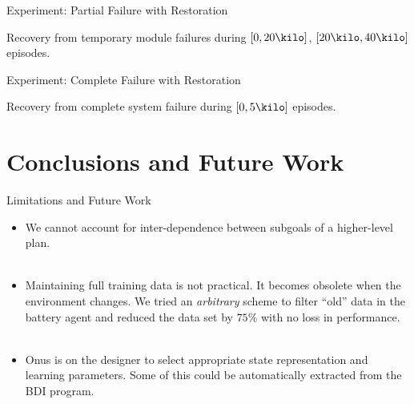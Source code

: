 \documentclass[10pt]{beamer}
\renewcommand\example[1]{{\color{black!50!green}#1}}
\begin{document}
\begin{frame}[allowframebreaks]{Experiment: Partial Failure with Restoration}
\begin{center}
\resizebox{0.7\textwidth}{!}{

}

Recovery from \alert{temporary module failures} during $[0,20\kilo]$, $[20\kilo,40\kilo]$ episodes.
\end{center}
\end{frame}

\begin{frame}[allowframebreaks]{Experiment: Complete Failure with Restoration}
\begin{center}
\resizebox{0.7\textwidth}{!}{

}

Recovery from \alert{complete system failure} during $[0,5\kilo]$ episodes.
\end{center}
\end{frame}


\section{Conclusions and Future Work}

\begin{frame}{Limitations and Future Work}
\begin{itemize}
\item<+-> We cannot account for \alert{inter-dependence between subgoals} of a higher-level plan.\\~\\
\item<+-> \alert{Maintaining full training data is not practical}. It becomes obsolete when the environment changes. \example{We tried an {\em arbitrary} scheme to filter ``old'' data in the battery agent and reduced the data set by $75\%$ with no loss in performance.}\\~\\
\item<+-> Onus is on the designer to select appropriate state representation and learning parameters. \example{Some of this could be automatically extracted from the BDI program.}
\end{itemize}
\end{frame}
\end{document}
